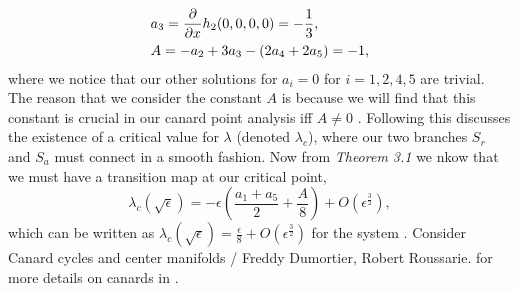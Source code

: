 \begin{align}
&a_3=\pd{}{x}h_2(0,0,0,0)=-\frac{1}{3},\\
&A=-a_2+3a_3-(2a_4+2a_5)=-1,
\end{align}
where we notice that our other solutions for $a_i=0$ for $i=1,2,4,5$ are trivial. The reason that we consider the constant $A$ is because we will find that this constant is crucial in our canard point analysis iff $A\neq 0$ \citep{krupa2001}. Following this \citep{krupa2001} discusses the existence of a critical value for $\lambda$ (denoted $\lambda_c$), where our two branches $S_r$ and $S_a$ must connect in a smooth fashion. Now from \textit{Theorem 3.1} we nkow that we must have a transition map at our critical point,
\begin{equation}
\lambda_c(\sqrt{\epsilon})=-\epsilon(\frac{a_1+a_5}{2}+\frac{A}{8})+O(\epsilon^\frac{3}{2}),
\end{equation}
which can be written as $\lambda_c(\sqrt{\epsilon})=\frac{\epsilon}{8}+O(\epsilon^\frac{3}{2})$ for the \vdp system \citep{krupa2001}. Consider Canard cycles and center manifolds / Freddy Dumortier, Robert Roussarie. for more details on canards in \vdp.


